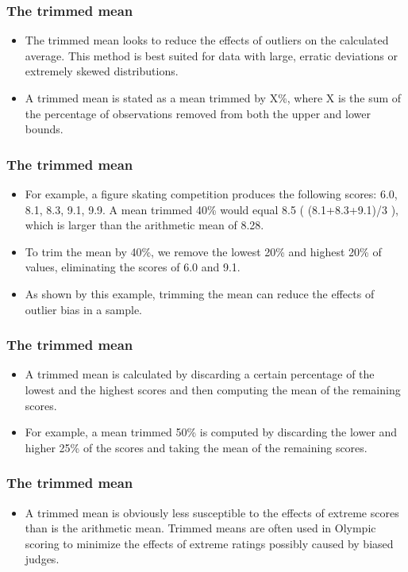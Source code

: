 \documentclass{beamer}
\begin{document}
\begin{frame}

\end{frame}
\begin{frame}
\frametitle{The trimmed mean}
\Large
\begin{itemize}
\item The trimmed mean looks to reduce the effects of outliers on the calculated average. This method is best suited for data with large, erratic deviations or extremely skewed distributions. \item  A trimmed mean is stated as a mean trimmed by X\%, where X is the sum of the percentage of observations removed from both the upper and lower bounds.
\end{itemize}
\end{frame}
\begin{frame}
\frametitle{The trimmed mean}
\Large
\begin{itemize}
\item For example, a figure skating competition produces the following scores: 6.0, 8.1, 8.3, 9.1, 9.9. A mean trimmed 40\% would equal 8.5 ( (8.1+8.3+9.1)/3 ), which is larger than the arithmetic mean of 8.28. \item To trim the mean by 40\%, we remove the lowest 20\% and highest 20\% of values, eliminating the scores of 6.0 and 9.1. 
\item As shown by this example, trimming the mean can reduce the effects of outlier bias in a sample.
\end{itemize}
\end{frame}
\begin{frame}
\frametitle{The trimmed mean}
\Large
\begin{itemize}
\item 
A trimmed mean is calculated by discarding a certain percentage of the lowest and the highest scores and then computing the mean of the remaining scores.
\item  For example, a mean trimmed 50\% is computed by discarding the lower and higher 25\% of the scores and taking the mean of the remaining scores.
\end{itemize}
\end{frame}
\begin{frame}
\frametitle{The trimmed mean}
\Large
\begin{itemize}
\item A trimmed mean is obviously less susceptible to the effects of extreme scores than is the arithmetic mean. Trimmed means are often used in Olympic scoring to minimize the effects of extreme ratings possibly caused by biased judges.
\end{itemize}
\end{frame}
\end{document}
